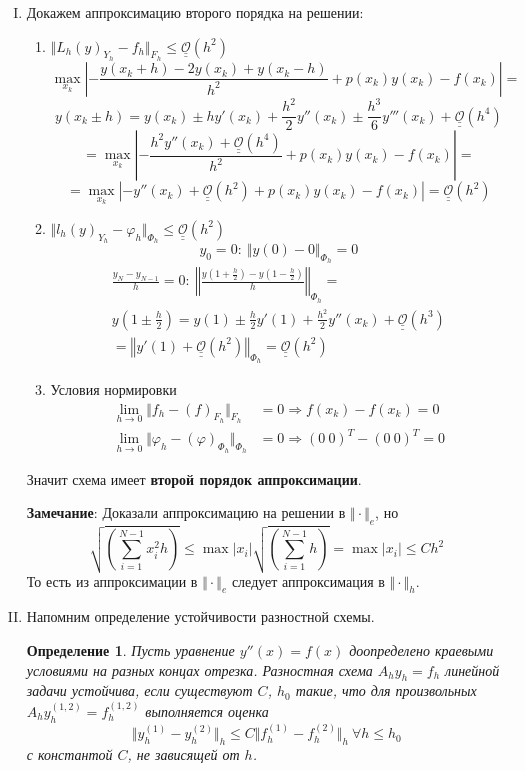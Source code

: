 \documentclass[12pt]{article}
\newtheorem*{definition}{Определение}
\def\bigO{ \underline{\underline{\mathcal{O}}} }
\begin{document}
    \newpage

    \begin{enumerate}[I.]
        \item Докажем аппроксимацию второго порядка на решении:
        \begin{enumerate}
            \item $\Vert L_h(y)_{Y_h}-f_h\Vert_{F_h}\leq\bigO(h^2)$
            \[\max_{x_k}\left|-\frac{y(x_k+h)-2y(x_k)+y(x_k-h)}{h^2}+p(x_k)y(x_k)-f(x_k)\right|=\]
            \[y(x_k\pm h)=y(x_k)\pm hy'(x_k)+\frac{h^2}{2}y''(x_k)\pm\frac{h^3}{6}y'''(x_k)+\bigO(h^4)\]
            \[=\max_{x_k}\left|-\frac{h^2y''(x_k)+\bigO(h^4)}{h^2}+p(x_k)y(x_k)-f(x_k)\right|=\]
            \[=\max_{x_k}\left|-y''(x_k)+\bigO(h^2)+p(x_k)y(x_k)-f(x_k)\right|=\bigO(h^2)\]
            \item $\Vert l_h(y)_{Y_h}-\varphi_h\Vert_{\Phi_h}\leq\bigO(h^2)$
                \[y_0 = 0:\ \Vert y(0)-0\Vert_{\Phi_h}=0\]
                \begin{multline*}
			\frac{y_N - y_{N-1}}{h} = 0:\ \left\Vert\frac{y\left(1+\frac{h}{2}\right)-y\left(1-\frac{h}{2}\right)}{h}\right\Vert_{\Phi_h}= \\
                    y\left(1\pm \frac{h}{2}\right)=y(1)\pm \frac{h}{2}y'(1)+\frac{h^2}{2}y''(x_k)+\bigO(h^3) \\
                    =\left\Vert y'(1)+\bigO(h^2)\right\Vert_{\Phi_h}=\bigO(h^2)
                \end{multline*}
            \item Условия нормировки
            \begin{align*}
                \lim_{h\rightarrow0}\Vert f_h-(f)_{F_h}\Vert_{F_h}&=0 \Rightarrow f(x_k)-f(x_k) = 0\\
                \lim_{h\rightarrow0}\Vert \varphi_h-(\varphi)_{\Phi_h}\Vert_{\Phi_h}&=0 \Rightarrow (0\ 0)^T - (0\ 0)^T = 0
            \end{align*}
        \end{enumerate}
        Значит схема имеет \textbf{второй порядок аппроксимации}.
        
        \textbf{Замечание}: Доказали аппроксимацию на решении в $\Vert\cdot\Vert_e$, но
        \[\sqrt{\left(\sum_{i=1}^{N-1}x_i^2h\right)}\leq\max|x_i|\sqrt{\left(\sum_{i=1}^{N-1}h\right)}=\max|x_i|\leq C h^2\]
        То есть из аппроксимации в $\Vert\cdot\Vert_e$ следует аппроксимация в $\Vert\cdot\Vert_h$.

        \newpage

        \item Напомним определение устойчивости разностной схемы.
        \begin{definition}
            Пусть уравнение $y''(x)=f(x)$ доопределено краевыми
            условиями на разных концах отрезка. Разностная схема
            $A_hy_h = f_h$ линейной задачи устойчива, если существуют $C$, $h_0$ такие, что для
            произвольных $A_hy^{(1,2)}_h = f^{(1,2)}_h$ выполняется оценка
            \[\Vert y^{(1)}_h-y^{(2)}_h\Vert_h\leq C\Vert f^{(1)}_h -f^{(2)}_h\Vert_h\ \forall h\leq h_0\]
            с константой $C$, не зависящей от $h$.
        \end{definition}


\end{enumerate}
\end{document}
